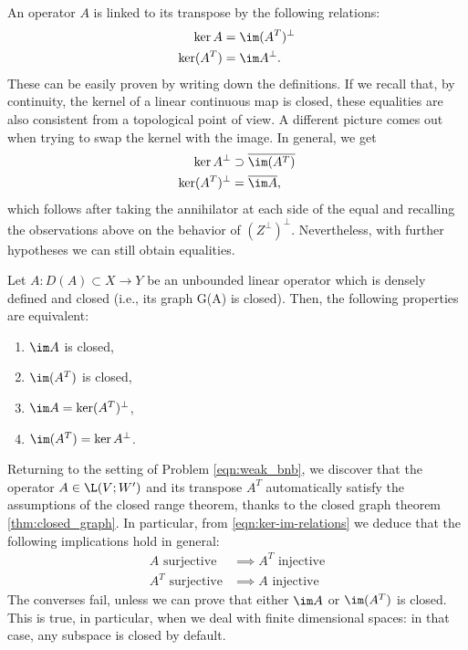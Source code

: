 An operator $A$ is linked to its transpose by the following relations:
\begin{align}\label{eqn:ker-im-relations}
	\ker A &= \im (A^T)^\perp \\
	\ker (A^T) &= \im A^\perp.
\end{align}
These can be easily proven by writing down the definitions. If we recall that, by continuity, the kernel of a linear continuous map is closed, these equalities are also consistent from a topological point of view. A different picture comes out when trying to swap the kernel with the image. In general, we get
\begin{align}
	\ker A^\perp &\supset \overline{\im (A^T)} \\
	\ker (A^T)^\perp &= \overline{\im A},
\end{align}
which follows after taking the annihilator at each side of the equal and recalling the observations above on the behavior of $(Z^\perp)^\perp$. Nevertheless, with further hypotheses we can still obtain equalities.

\begin{theorem}\label{thm:closed_range}
	Let $A: D(A) \subset X \to Y$ be an unbounded linear operator which is densely defined and closed (i.e., its graph G(A) is closed). Then, the following properties are equivalent:
	\begin{enumerate}
		\item $\im A$ is closed,
		\item $\im (A^T)$ is closed,
		\item $\im A = \ker (A^T)^\perp$,
		\item $\im (A^T) = \ker A^\perp$.
	\end{enumerate}
\end{theorem}

Returning to the setting of Problem \eqref{eqn:weak_bnb}, we discover that the operator $A \in \L(V;W')$ and its transpose $A^T$ automatically satisfy the assumptions of the closed range theorem, thanks to the closed graph theorem \ref{thm:closed_graph}.
In particular, from \eqref{eqn:ker-im-relations} we deduce that the following implications hold in general:
\begin{align}
	\text{$A$ surjective} &\implies \text{$A^T$ injective} \\
	\text{$A^T$ surjective} &\implies \text{$A$ injective}
\end{align}
The converses fail, unless we can prove that either $\im A$ or $\im (A^T)$ is closed. This is true, in particular, when we deal with finite dimensional spaces: in that case, any subspace is closed by default.

